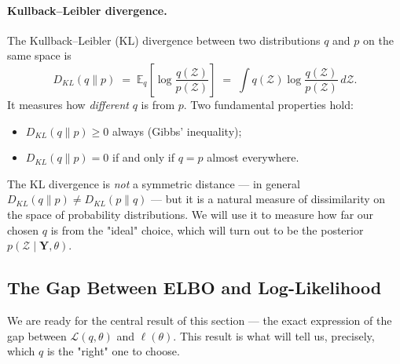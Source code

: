 \documentclass[11pt, a4paper, oneside]{article}
\newcommand{\mY}{\mathbf{Y}}
\begin{document}
\paragraph{Kullback–Leibler divergence.}
The Kullback–Leibler (KL) divergence between two distributions $q$ and
$p$ on the same space is
\[
D_{KL}(q \| p) \;=\; \mathbb{E}_q\!\left[\log \frac{q(\mathcal{Z})}{p(\mathcal{Z})}\right]
\;=\; \int q(\mathcal{Z}) \log \frac{q(\mathcal{Z})}{p(\mathcal{Z})}\, d\mathcal{Z}.
\]
It measures how \emph{different} $q$ is from $p$. Two fundamental
properties hold:
\begin{itemize}[leftmargin=1.5em, itemsep=2pt]
    \item $D_{KL}(q \| p) \geq 0$ always (Gibbs' inequality);
    \item $D_{KL}(q \| p) = 0$ if and only if $q = p$ almost everywhere.
\end{itemize}
The KL divergence is \emph{not} a symmetric distance — in general
$D_{KL}(q \| p) \neq D_{KL}(p \| q)$ — but it is a natural measure of
dissimilarity on the space of probability distributions. We will use it
to measure how far our chosen $q$ is from the "ideal" choice, which will
turn out to be the posterior $p(\mathcal{Z} \mid \mY, \theta)$.

\subsection{The Gap Between ELBO and Log-Likelihood}

We are ready for the central result of this section — the exact
expression of the gap between $\mathcal{L}(q, \theta)$ and
$\ell(\theta)$. This result is what will tell us, precisely, which $q$
is the "right" one to choose.
\end{document}
